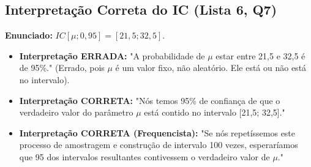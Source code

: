 \subsection{Interpretação Correta do IC (Lista 6, Q7)}
\textbf{Enunciado:} $IC[\mu; 0,95] = [21,5; 32,5]$.
\begin{itemize}
    \item \textbf{Interpretação ERRADA:} "A probabilidade de $\mu$ estar entre 21,5 e 32,5 é de 95\%." (Errado, pois $\mu$ é um valor fixo, não aleatório. Ele está ou não está no intervalo).
    \item \textbf{Interpretação CORRETA:} "Nós temos 95\% de confiança de que o verdadeiro valor do parâmetro $\mu$ está contido no intervalo [21,5; 32,5]."
    \item \textbf{Interpretação CORRETA (Frequencista):} "Se nós repetíssemos este processo de amostragem e construção de intervalo 100 vezes, esperaríamos que 95 dos intervalos resultantes contivessem o verdadeiro valor de $\mu$."
\end{itemize}